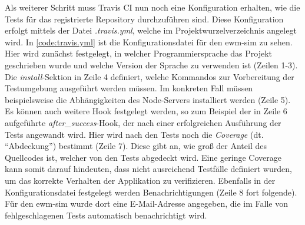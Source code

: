 Als weiterer Schritt muss Travis CI nun noch eine Konfiguration erhalten, wie die Tests für das registrierte Repository durchzuführen sind.
Diese Konfiguration erfolgt mittels der Datei \emph{.travis.yml}, welche im Projektwurzelverzeichnis angelegt wird.
In \autoref{code:travis.yml} ist die Konfigurationsdatei für den \ac{ewm-sim} zu sehen.
Hier wird zunächst festgelegt, in welcher Programmiersprache das Projekt geschrieben wurde und welche Version der Sprache zu verwenden ist (Zeilen 1-3).
Die \emph{install}-Sektion in Zeile 4 definiert, welche Kommandos zur Vorbereitung der Testumgebung ausgeführt werden müssen.
Im konkreten Fall müssen beispielsweise die Abhängigkeiten des Node-Servers installiert werden (Zeile 5).
Es können auch weitere Hook festgelegt werden, so zum Beispiel der in Zeile 6 aufgeführte \emph{after\_success}-Hook, der nach einer erfolgreichen Ausführung der Tests angewandt wird.
Hier wird nach den Tests noch die \emph{Coverage} (dt. \enquote{Abdeckung}) bestimmt (Zeile 7).
Diese gibt an, wie groß der Anteil des Quellcodes ist, welcher von den Tests abgedeckt wird.
Eine geringe Coverage kann somit darauf hindeuten, dass nicht ausreichend Testfälle definiert wurden, um das korrekte Verhalten der Applikation zu verifizieren.
Ebenfalls in der Konfigurationsdatei festgelegt werden Benachrichtigungen (Zeile 8 fort folgende).
Für den \ac{ewm-sim} wurde dort eine E-Mail-Adresse angegeben, die im Falle von fehlgeschlagenen Tests automatisch benachrichtigt wird.~\cite{travis-tutorial}




